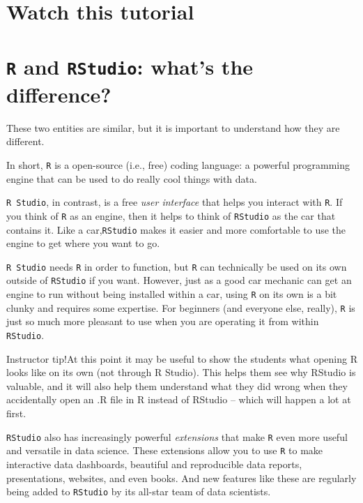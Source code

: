 \documentclass[
]{book}
\begin{document}
\hypertarget{watch-this-tutorial}{%
\section*{Watch this tutorial}\label{watch-this-tutorial}}

\hypertarget{r-and-rstudio-whats-the-difference}{%
\section*{\texorpdfstring{\texttt{R} and \texttt{RStudio}: what's the difference?}{R and RStudio: what's the difference?}}\label{r-and-rstudio-whats-the-difference}}

These two entities are similar, but it is important to understand how they are different.

In short, \texttt{R} is a open-source (i.e., free) coding language: a powerful programming engine that can be used to do really cool things with data.

\texttt{R\ Studio}, in contrast, is a free \emph{user interface} that helps you interact with \texttt{R}. If you think of \texttt{R} as an engine, then it helps to think of \texttt{RStudio} as the car that contains it. Like a car,\texttt{RStudio} makes it easier and more comfortable to use the engine to get where you want to go.

\texttt{R\ Studio} needs \texttt{R} in order to function, but \texttt{R} can technically be used on its own outside of \texttt{RStudio} if you want. However, just as a good car mechanic can get an engine to run without being installed within a car, using \texttt{R} on its own is a bit clunky and requires some expertise. For beginners (and everyone else, really), \texttt{R} is just so much more pleasant to use when you are operating it from within \texttt{RStudio}.

Instructor tip!At this point it may be useful to show the students what opening R looks like on its own (not through R Studio). This helps them see why RStudio is valuable, and it will also help them understand what they did wrong when they accidentally open an .R file in R instead of RStudio -- which will happen a lot at first.

\texttt{RStudio} also has increasingly powerful \emph{extensions} that make \texttt{R} even more useful and versatile in data science. These extensions allow you to use \texttt{R} to make interactive data dashboards, beautiful and reproducible data reports, presentations, websites, and even books. And new features like these are regularly being added to \texttt{RStudio} by its all-star team of data scientists.
\end{document}
